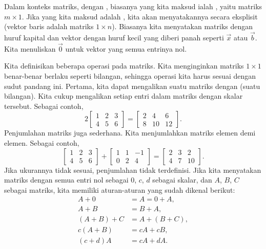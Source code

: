 Dalam konteks matriks,
dengan \emph{}, biasanya yang kita maksud ialah
\emph{}, yaitu matriks $m \times 1$.
Jika yang kita maksud adalah \emph{},
kita akan menyatakannya secara eksplisit (vektor baris adalah matriks $1 \times n$).
Biasanya kita menyatakan
matriks dengan huruf kapital dan vektor dengan huruf kecil yang diberi
panah seperti $\vec{x}$ atau $\vec{b}$.  Kita menuliskan $\vec{0}$ untuk vektor yang semua entrinya nol.

Kita definisikan beberapa operasi pada matriks.  Kita
menginginkan matriks $1 \times 1$ benar-benar berlaku seperti bilangan, sehingga operasi kita
harus sesuai dengan sudut pandang ini.
Pertama, kita dapat mengalikan suatu matriks dengan
\emph{} (suatu bilangan).
Kita cukup mengalikan setiap entri dalam matriks dengan skalar tersebut.  Sebagai contoh,
\begin{equation*}
2
\begin{bmatrix}
1 & 2 & 3 \\
4 & 5 & 6
\end{bmatrix} =
\begin{bmatrix}
2 & 4 & 6 \\
8 & 10 & 12
\end{bmatrix} .
\end{equation*}
Penjumlahan matriks juga sederhana.
Kita menjumlahkan matriks elemen demi elemen.
Sebagai contoh,
\begin{equation*}
\begin{bmatrix}
1 & 2 & 3 \\
4 & 5 & 6
\end{bmatrix} +
\begin{bmatrix}
1 & 1 & -1 \\
0 & 2 & 4
\end{bmatrix}
=
\begin{bmatrix}
2 & 3 & 2 \\
4 & 7 & 10
\end{bmatrix} .
\end{equation*}
Jika ukurannya tidak sesuai, penjumlahan tidak terdefinisi.
Jika kita menyatakan matriks dengan semua entri nol sebagai 0,
$c$, $d$ sebagai skalar, dan $A$, $B$, $C$ sebagai matriks, kita
memiliki aturan-aturan yang sudah dikenal berikut:
\begin{align*}
A + 0 & = A = 0 + A , \\
A + B & = B + A , \\
(A + B) + C & = A + (B + C) , \\
c(A+B) & = cA+cB, \\
(c+d)A & = cA + dA.
\end{align*}

